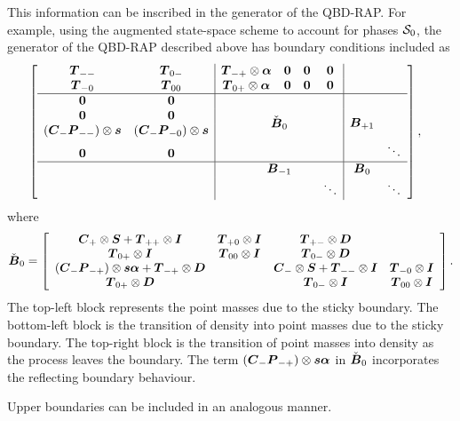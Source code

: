 This information can be inscribed in the generator of the QBD-RAP. For example, using the augmented state-space scheme to account for phases \(\mathcal{S}_0\), the generator of the QBD-RAP described above has boundary conditions included as 
\begin{align*}
&\left[\begin{array}{cc|cccc|cc}
	\bs T_{--} & \bs T_{0-} & \bs T_{-+} \otimes\bs \alpha & \bs 0 & \bs 0 & \bs 0 &&\\
	\bs T_{-0} & \bs T_{00} & \bs T_{0+} \otimes\bs \alpha & \bs 0 & \bs 0 & \bs 0 &&\\\hline
	\bs 0 & \bs 0 &\multicolumn{4}{c|}{\multirow{4}{*}{$\check{\bs B}_{0}$}} & \multirow{4}{*}{$\bs B_{+1}$}& \\
	\bs 0 & \bs 0 & \multicolumn{4}{c|}{} & &\\
	(\bs C_-\bs P_{--})\otimes \bs s &(\bs C_-\bs P_{-0}) \otimes \bs s & \multicolumn{4}{c|}{} &&\\
	\bs 0 & \bs 0 & \multicolumn{4}{c|}{} && \ddots\\ \hline
	& & \multicolumn{4}{c|}{\bs B_{-1}} & \bs B_0 &\\
	& & \multicolumn{3}{c}{}& \ddots &  & \ddots
	\end{array}\right],
\end{align*}
where 
\[\check{\boldsymbol B}_{0} = \left[\begin{array}{cccc}
	 \boldsymbol{C}_+\otimes \boldsymbol{S} + \boldsymbol{T}_{++}\otimes \boldsymbol{I} & \boldsymbol{T}_{+0}\otimes \boldsymbol{I} & \boldsymbol{T}_{+-}\otimes \boldsymbol{D} & \\
	 \boldsymbol{T}_{0+}\otimes \boldsymbol{I} & \boldsymbol{T}_{00}\otimes \boldsymbol{I} & \boldsymbol{T}_{0-}\otimes \boldsymbol{D} & \\
	 (\boldsymbol C_-\boldsymbol P_{-+})\otimes \boldsymbol s \boldsymbol \alpha + \boldsymbol T_{-+}\otimes \boldsymbol D  &  & \boldsymbol{C}_-\otimes \boldsymbol{S} + \boldsymbol{T}_{--}\otimes \boldsymbol{I} & \boldsymbol{T}_{-0}\otimes \boldsymbol{I} \\
	 \boldsymbol{T}_{0+}\otimes \boldsymbol{D} & & \boldsymbol{T}_{0-}\otimes \boldsymbol{I} & \boldsymbol{T}_{00}\otimes \boldsymbol{I} 
	\end{array}\right].\]
The top-left block represents the point masses due to the sticky boundary. The bottom-left block is the transition of density into point masses due to the sticky boundary. The top-right block is the transition of point masses into density as the process leaves the boundary. The term \((\boldsymbol C_-\boldsymbol P_{-+})\otimes \boldsymbol s \boldsymbol \alpha\) in \(\check{\boldsymbol B}_{0}\) incorporates the reflecting boundary behaviour.

Upper boundaries can be included in an analogous manner. 

